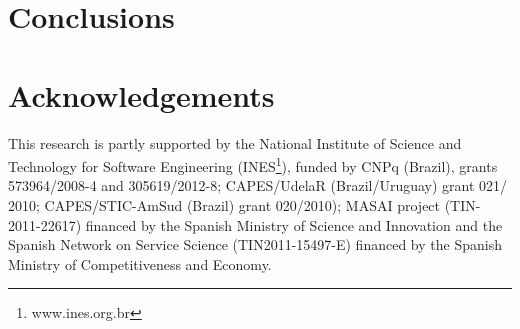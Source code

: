 \documentclass{llncs}
\theoremstyle{plain}
\theoremstyle{plain}
\theoremstyle{plain}
\begin{document}
\section{Conclusions}
\label{sec:conclusions}


\section*{Acknowledgements}
\small
This research is partly supported by the National Institute of Science and Technology for Software Engineering (INES\footnote{www.ines.org.br}), funded by CNPq (Brazil), grants 573964/2008-4 and 305619/2012-8; CAPES/UdelaR (Brazil/Uruguay) grant 021/ 2010; CAPES/STIC-AmSud (Brazil) grant 020/2010); MASAI project (TIN-2011-22617) financed by the Spanish Ministry of Science and Innovation and the Spanish Network on Service Science (TIN2011-15497-E) financed by the Spanish Ministry of Competitiveness and Economy. 

\normalsize  

 
\end{document}
